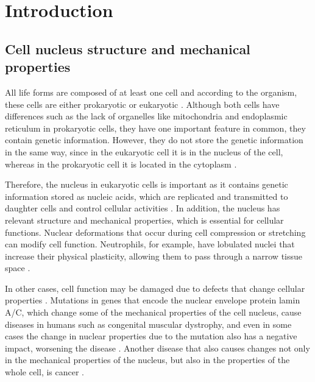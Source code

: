 \documentclass[12pt, a4paper]{article} %
\begin{document}
\section{Introduction}

\subsection{Cell nucleus structure and mechanical properties}

All life forms are composed of at least one cell \cite{mazzarello1999unifying} and according to the organism, these cells are either prokaryotic or eukaryotic \cite{vellai1999origin}. Although both cells have differences such as the lack of organelles like mitochondria \cite{keeling2008organelle} and endoplasmic reticulum \cite{rapoport2007protein} in prokaryotic cells, they have one important feature in common, they contain genetic information. However, they do not store the genetic information in the same way, since in the eukaryotic cell it is in the nucleus of the cell, whereas in the prokaryotic cell it is located in the cytoplasm \cite{cook1983mucus}.

\setlength{\parskip}{4mm}

Therefore, the nucleus in eukaryotic cells is important as it contains genetic information stored as nucleic acids, which are replicated and transmitted to daughter cells and control cellular activities \cite{ossareh2001protein}. In addition, the nucleus has relevant structure and mechanical properties, which is essential for cellular functions. Nuclear deformations that occur during cell compression or stretching can modify cell function. Neutrophils, for example, have lobulated nuclei that increase their physical plasticity, allowing them to pass through a narrow tissue space \cite{hoffmann2011integrin}.

In other cases, cell function may be damaged due to defects that change cellular properties \cite{lammerding2011mechanics}. Mutations in genes that encode the nuclear envelope protein lamin A/C, which change some of the mechanical properties of the cell nucleus, cause diseases in humans such as congenital muscular dystrophy, and even in some cases the change in nuclear properties due to the mutation also has a negative impact, worsening the disease \cite{lammerding2004lamin}. Another disease that also causes changes not only in the mechanical properties of the nucleus, but also in the properties of the whole cell, is cancer \cite{jacobs2012introduction, lekka2019measuring, cross2007nanomechanical}.
\end{document}
